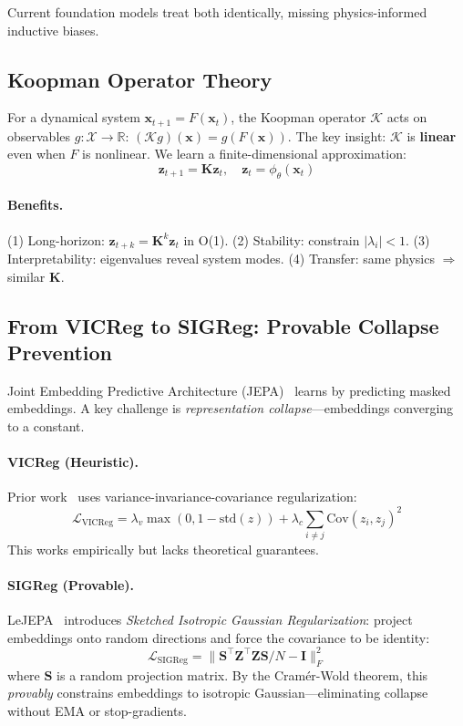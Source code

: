 \documentclass{article}
\begin{document}
Current foundation models treat both identically, missing physics-informed inductive biases.

\subsection{Koopman Operator Theory}

For a dynamical system $\mathbf{x}_{t+1} = F(\mathbf{x}_t)$, the Koopman operator $\mathcal{K}$ acts on observables $g: \mathcal{X} \rightarrow \mathbb{R}$: $(\mathcal{K} g)(\mathbf{x}) = g(F(\mathbf{x}))$. The key insight: $\mathcal{K}$ is \textbf{linear} even when $F$ is nonlinear. We learn a finite-dimensional approximation:
\begin{equation}
    \mathbf{z}_{t+1} = \mathbf{K} \mathbf{z}_t, \quad \mathbf{z}_t = \phi_\theta(\mathbf{x}_t)
\end{equation}

\paragraph{Benefits.} (1) Long-horizon: $\mathbf{z}_{t+k} = \mathbf{K}^k \mathbf{z}_t$ in O(1). (2) Stability: constrain $|\lambda_i| < 1$. (3) Interpretability: eigenvalues reveal system modes. (4) Transfer: same physics $\Rightarrow$ similar $\mathbf{K}$.

\subsection{From VICReg to SIGReg: Provable Collapse Prevention}

Joint Embedding Predictive Architecture (JEPA)~\cite{ijepa,vjepa} learns by predicting masked embeddings. A key challenge is \emph{representation collapse}—embeddings converging to a constant.

\paragraph{VICReg (Heuristic).} Prior work~\cite{vicreg,cjepa} uses variance-invariance-covariance regularization:
\begin{equation}
    \mathcal{L}_{\text{VICReg}} = \lambda_v \max(0, 1 - \text{std}(z)) + \lambda_c \sum_{i \neq j} \text{Cov}(z_i, z_j)^2
\end{equation}
This works empirically but lacks theoretical guarantees.

\paragraph{SIGReg (Provable).} LeJEPA~\cite{lejepa2024} introduces \emph{Sketched Isotropic Gaussian Regularization}: project embeddings onto random directions and force the covariance to be identity:
\begin{equation}
    \mathcal{L}_{\text{SIGReg}} = \| \mathbf{S}^\top \mathbf{Z}^\top \mathbf{Z} \mathbf{S} / N - \mathbf{I} \|_F^2
\end{equation}
where $\mathbf{S}$ is a random projection matrix. By the Cramér-Wold theorem, this \emph{provably} constrains embeddings to isotropic Gaussian—eliminating collapse without EMA or stop-gradients.
\end{document}
